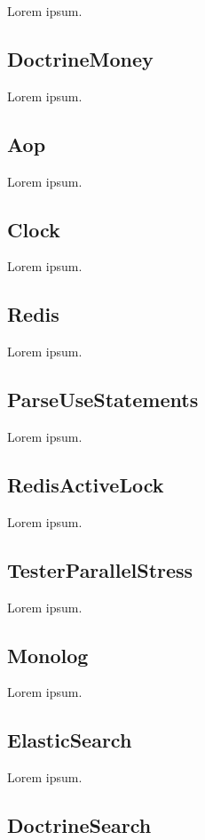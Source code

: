 Lorem ipsum.

\subsection{DoctrineMoney}

Lorem ipsum.

\subsection{Aop}

Lorem ipsum.

\subsection{Clock}

Lorem ipsum.

\subsection{Redis}

Lorem ipsum.

\subsection{ParseUseStatements}

Lorem ipsum.

\subsection{RedisActiveLock}

Lorem ipsum.

\subsection{TesterParallelStress}

Lorem ipsum.

\subsection{Monolog}

Lorem ipsum.

\subsection{ElasticSearch}

Lorem ipsum.

\subsection{DoctrineSearch}

